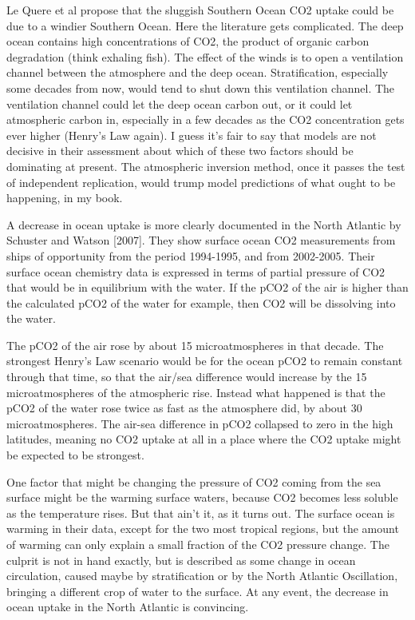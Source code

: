 \documentclass[
]{book}
\begin{document}
Le Quere et al propose that the sluggish Southern Ocean CO2 uptake could be due to a windier Southern Ocean. Here the literature gets complicated. The deep ocean contains high concentrations of CO2, the product of organic carbon degradation (think exhaling fish). The effect of the winds is to open a ventilation channel between the atmosphere and the deep ocean. Stratification, especially some decades from now, would tend to shut down this ventilation channel. The ventilation channel could let the deep ocean carbon out, or it could let atmospheric carbon in, especially in a few decades as the CO2 concentration gets ever higher (Henry's Law again). I guess it's fair to say that models are not decisive in their assessment about which of these two factors should be dominating at present. The atmospheric inversion method, once it passes the test of independent replication, would trump model predictions of what ought to be happening, in my book.

A decrease in ocean uptake is more clearly documented in the North Atlantic by Schuster and Watson {[}2007{]}. They show surface ocean CO2 measurements from ships of opportunity from the period 1994-1995, and from 2002-2005. Their surface ocean chemistry data is expressed in terms of partial pressure of CO2 that would be in equilibrium with the water. If the pCO2 of the air is higher than the calculated pCO2 of the water for example, then CO2 will be dissolving into the water.

The pCO2 of the air rose by about 15 microatmospheres in that decade. The strongest Henry's Law scenario would be for the ocean pCO2 to remain constant through that time, so that the air/sea difference would increase by the 15 microatmospheres of the atmospheric rise. Instead what happened is that the pCO2 of the water rose twice as fast as the atmosphere did, by about 30 microatmospheres. The air-sea difference in pCO2 collapsed to zero in the high latitudes, meaning no CO2 uptake at all in a place where the CO2 uptake might be expected to be strongest.

One factor that might be changing the pressure of CO2 coming from the sea surface might be the warming surface waters, because CO2 becomes less soluble as the temperature rises. But that ain't it, as it turns out. The surface ocean is warming in their data, except for the two most tropical regions, but the amount of warming can only explain a small fraction of the CO2 pressure change. The culprit is not in hand exactly, but is described as some change in ocean circulation, caused maybe by stratification or by the North Atlantic Oscillation, bringing a different crop of water to the surface. At any event, the decrease in ocean uptake in the North Atlantic is convincing.
\end{document}
